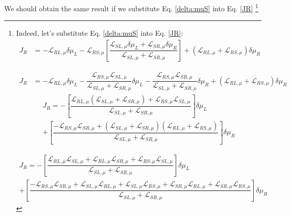 We should obtain the same result if we substitute Eq. \eqref{delta:muS} into Eq. \eqref{JR} \footnote{Indeed, let's substitute Eq. \eqref{delta:muS} into Eq. \eqref{JR}:
\begin{align*}
J_{R}&= 
-\mathcal{L}_{RL,\mu}\delta\mu_{L} 
-\mathcal{L}_{RS,\mu}\left[\dfrac{\mathcal{L}_{SL,\mu}\delta\mu_{L}+\mathcal{L}_{SR,\mu}\delta\mu_{R}}{\mathcal{L}_{SL,\mu}+\mathcal{L}_{SR,\mu}}\right]
+
(\mathcal{L}_{RL,\mu}+\mathcal{L}_{RS,\mu})\delta\mu_{R}
\end{align*}

\begin{align*}
J_{R}&= 
-\mathcal{L}_{RL,\mu}\delta\mu_{L} 
-
\dfrac{\mathcal{L}_{RS,\mu}\mathcal{L}_{SL,\mu}}{\mathcal{L}_{SL,\mu}+\mathcal{L}_{SR,\mu}}\delta\mu_{L}
-
\dfrac{\mathcal{L}_{RS,\mu}\mathcal{L}_{SR,\mu}}{\mathcal{L}_{SL,\mu}+\mathcal{L}_{SR,\mu}}\delta\mu_{R}
+
(\mathcal{L}_{RL,\mu}+\mathcal{L}_{RS,\mu})\delta\mu_{R}
\end{align*}
\begin{multline*}
J_{R}= 
-\left[
\dfrac{\mathcal{L}_{RL,\mu}(\mathcal{L}_{SL,\mu}+\mathcal{L}_{SR,\mu})+\mathcal{L}_{RS,\mu}\mathcal{L}_{SL,\mu}}{\mathcal{L}_{SL,\mu}+\mathcal{L}_{SR,\mu}}\right]\delta\mu_{L}
\\+\left[
\dfrac{-\mathcal{L}_{RS,\mu}\mathcal{L}_{SR,\mu}+(\mathcal{L}_{SL,\mu}+\mathcal{L}_{SR,\mu})(\mathcal{L}_{RL,\mu}+\mathcal{L}_{RS,\mu})}{\mathcal{L}_{SL,\mu}+\mathcal{L}_{SR,\mu}}\right]\delta\mu_{R}
\end{multline*}

\begin{multline*}
J_{R}= 
-\left[
\dfrac{\mathcal{L}_{RL,\mu}\mathcal{L}_{SL,\mu}+\mathcal{L}_{RL,\mu}\mathcal{L}_{SR,\mu}+\mathcal{L}_{RS,\mu}\mathcal{L}_{SL,\mu}}{\mathcal{L}_{SL,\mu}+\mathcal{L}_{SR,\mu}}\right]\delta\mu_{L}
\\+\left[
\dfrac{-\mathcal{L}_{RS,\mu}\mathcal{L}_{SR,\mu}+\mathcal{L}_{SL,\mu}\mathcal{L}_{RL,\mu}
+\mathcal{L}_{SL,\mu}\mathcal{L}_{RS,\mu}
+\mathcal{L}_{SR,\mu}\mathcal{L}_{RL,\mu}
+\mathcal{L}_{SR,\mu}\mathcal{L}_{RS,\mu}}{\mathcal{L}_{SL,\mu}+\mathcal{L}_{SR,\mu}}\right]\delta\mu_{R}
\end{multline*}

}
